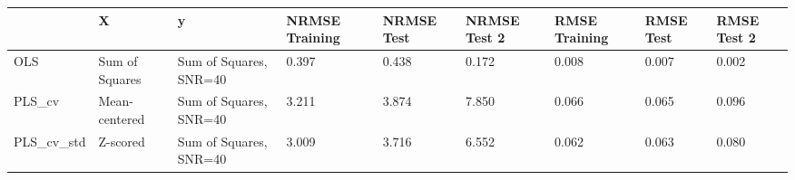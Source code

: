 \begin{tabular}{lllllllll}
\toprule
{} &               X &                       y & NRMSE Training & NRMSE Test & NRMSE Test 2 & RMSE Training & RMSE Test & RMSE Test 2 \\
\midrule
OLS        &  Sum of Squares &  Sum of Squares, SNR=40 &          0.397 &      0.438 &        0.172 &         0.008 &     0.007 &       0.002 \\
PLS_cv     &   Mean-centered &  Sum of Squares, SNR=40 &          3.211 &      3.874 &        7.850 &         0.066 &     0.065 &       0.096 \\
PLS_cv_std &        Z-scored &  Sum of Squares, SNR=40 &          3.009 &      3.716 &        6.552 &         0.062 &     0.063 &       0.080 \\
\bottomrule
\end{tabular}

